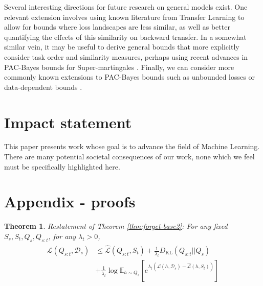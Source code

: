 \documentclass{article}
\theoremstyle{plain}
\newtheorem{theorem}{Theorem}[section]
\theoremstyle{definition}
\theoremstyle{remark}
\begin{document}
Several interesting directions for future research on general models exist. One relevant extension involves using known literature from Transfer Learning \citep{zhuang2020comprehensive} to allow for bounds where loss landscapes are less similar, as well as better quantifying the effects of this similarity on backward transfer.
In a somewhat similar vein, it may be useful to derive general bounds that more explicitly consider task order and similarity measures, perhaps using recent advances in PAC-Bayes bounds for Super-martingales \cite{haddouche2023pac}.
Finally, we can consider more commonly known extensions to PAC-Bayes bounds such as unbounded losses or data-dependent bounds \citep{rivasplata2020pac}.

\section*{Impact statement}
This paper presents work whose goal is to advance the field of Machine Learning. There are many potential societal consequences of our work, none which we feel must be specifically highlighted here.






\clearpage



\newpage
\appendix
\onecolumn

\section{Appendix - proofs} \label{append:proofs}

\begin{theorem} Restatement of Theorem \ref{thm:forget-base2}:
     For any fixed $S_s,S_t,Q_s,Q_{s:t}$, for any $
    \lambda_t>0$,
    \begin{align} 
\begin{split}
\mathcal{L}(Q_{s:t}, \mathcal{D}_s) &\leq \hat{\mathcal{L}}(Q_{s:t}, S_t) + \frac{1}{\lambda_t} D_{\mathrm{KL}}(Q_{s:t}||Q_{s})\\
&+\frac{1}{\lambda_t}\log\mathbb{E}_{h\sim Q_{s}}\left [e^{\lambda_t(\mathcal{L}(h,\mathcal{D}_s)-\hat{\mathcal{L}}(h,S_t))} \right ]
\end{split}
\end{align}
\end{theorem}
\end{document}
